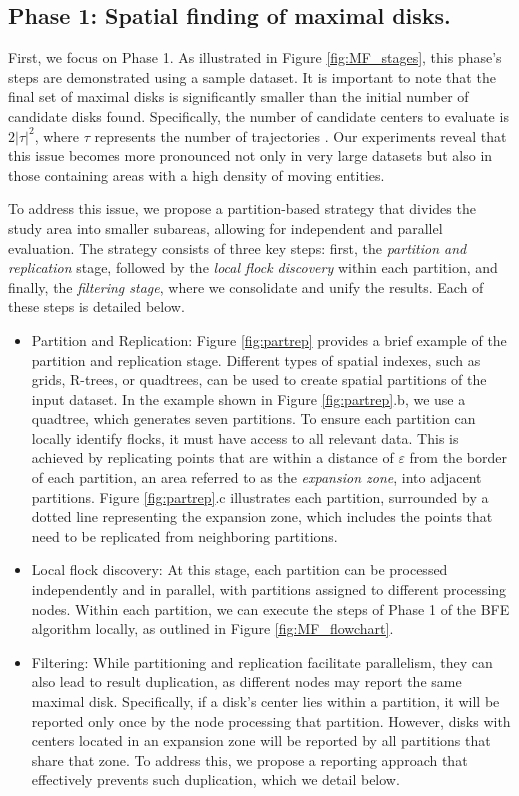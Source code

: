 \subsection{Phase 1: Spatial finding of maximal disks.}
First, we focus on Phase 1. As illustrated in Figure \ref{fig:MF_stages}, this phase's steps are demonstrated using a sample dataset. It is important to note that the final set of maximal disks is significantly smaller than the initial number of candidate disks found. Specifically, the number of candidate centers to evaluate is $2\lvert\tau\rvert^2$, where $\tau$ represents the number of trajectories \cite{vieira_2009}. Our experiments reveal that this issue becomes more pronounced not only in very large datasets but also in those containing areas with a high density of moving entities.

To address this issue, we propose a partition-based strategy that divides the study area into smaller subareas, allowing for independent and parallel evaluation. The strategy consists of three key steps: first, the \textit{partition and replication} stage, followed by the \textit{local flock discovery} within each partition, and finally, the \textit{filtering stage}, where we consolidate and unify the results. Each of these steps is detailed below.

\begin{itemize}
    \item Partition and Replication: Figure \ref{fig:partrep} provides a brief example of the partition and replication stage. Different types of spatial indexes, such as grids, R-trees, or quadtrees, can be used to create spatial partitions of the input dataset. In the example shown in Figure \ref{fig:partrep}.b, we use a quadtree, which generates seven partitions. To ensure each partition can locally identify flocks, it must have access to all relevant data. This is achieved by replicating points that are within a distance of $\varepsilon$ from the border of each partition, an area referred to as the \textit{expansion zone}, into adjacent partitions. Figure \ref{fig:partrep}.c illustrates each partition, surrounded by a dotted line representing the expansion zone, which includes the points that need to be replicated from neighboring partitions.

    \item Local flock discovery: At this stage, each partition can be processed independently and in parallel, with partitions assigned to different processing nodes. Within each partition, we can execute the steps of Phase 1 of the BFE algorithm locally, as outlined in Figure \ref{fig:MF_flowchart}.

    \item Filtering: While partitioning and replication facilitate parallelism, they can also lead to result duplication, as different nodes may report the same maximal disk. Specifically, if a disk's center lies within a partition, it will be reported only once by the node processing that partition. However, disks with centers located in an expansion zone will be reported by all partitions that share that zone. To address this, we propose a reporting approach that effectively prevents such duplication, which we detail below.
\end{itemize}

